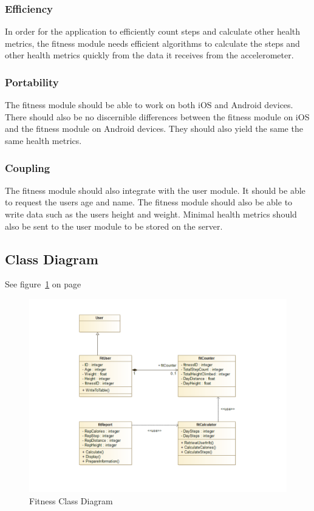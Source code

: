 \subsubsection{Efficiency} 
In order for the application to efficiently count steps and calculate other health metrics, the fitness module needs efficient algorithms to calculate the steps and other health metrics quickly from the data it receives from the accelerometer.  

\subsubsection{Portability} 
The fitness module should be able to work on both iOS and Android devices. There should also be no discernible differences between the fitness module on iOS and the fitness module on Android devices. They should also yield the same the same health metrics. 

\subsubsection{Coupling} 
The fitness module should also integrate with the user module. It should be able to request the users age and name. The fitness module should also be able to write data such as the users height and weight. Minimal health metrics should also be sent to the user module to be stored on the server. 

\subsection{Class Diagram}
See figure~\ref{fig:Fitness_Class_Diagram} on page~\pageref{fig:Fitness_Class_Diagram}
\begin{figure}
	\centering
	\includegraphics[scale=0.54]{Fitness/fitness_class_diagram.png}
	\caption{Fitness Class Diagram}
	\label{fig:Fitness_Class_Diagram}
\end{figure}

